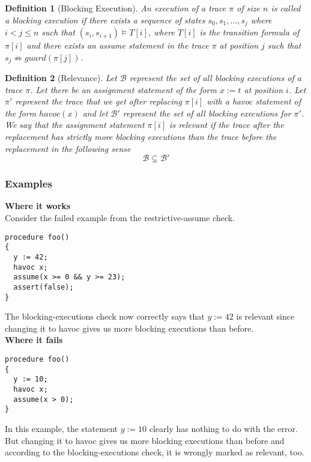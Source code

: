 \documentclass{article}
\newcommand{\limp}{\Rightarrow}
\newtheorem{mydef}{Definition}
\begin{document}
\begin{mydef}[Blocking Execution]\label{mydef:blockingexecution_definition}
An execution of a trace $\pi$ of size $n$ is called a \emph{blocking execution} if there exists a sequence of states $s_0, s_1,..., s_j$ where $i<j \leq n$ such that $(s_i, s_{i+1}) \models T[i]$, where $T[i]$ is the transition formula of $\pi[i]$ and there exists an assume statement in the trace $\pi$ at position $j$ such that $s_{j} \not \limp guard(\pi[j])$.
\end{mydef}

\begin{mydef}[Relevance]\label{mydef:relevancy_definition}
Let $\mathcal{B}$ represent the set of all blocking executions of a trace $\pi$. Let there be an assignment statement of the form $x:=t$ at position $i$. Let $\pi'$ represent the trace that we get after replacing $\pi[i]$ with a havoc statement of the form $havoc(x)$ and let $\mathcal{B}'$ represent the set of all blocking executions for $\pi'$.\\
We say that the assignment statement $\pi[i]$ is relevant if the trace after the replacement has strictly more blocking executions than the trace before the replacement in the following sense $$\mathcal{B} \subsetneq \mathcal{B}'$$
\end{mydef}
\subsubsection{Examples}
\textbf{Where it works}\\
Consider the failed example from the restrictive-assume check. 
\begin{lstlisting}
procedure foo()
{
  y := 42;
  havoc x;
  assume(x >= 0 && y >= 23);
  assert(false);
}
\end{lstlisting}
The blocking-executions check now correctly says that $y:=42$ is relevant since changing it to havoc gives us more blocking executions than before.\\
\textbf{Where it fails}
\begin{lstlisting}
procedure foo()
{
  y := 10;
  havoc x;
  assume(x > 0);
}
\end{lstlisting}
In this example, the statement $y:=10$ clearly has nothing to do with the error. But changing it to havoc gives us more blocking executions than before and according to the blocking-executions check, it is wrongly marked as relevant, too. 

\newpage
\end{document}
